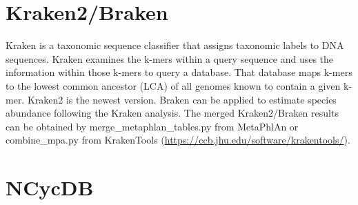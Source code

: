 \documentclass[
]{book}
\newenvironment{Shaded}{\begin{snugshade}}{\end{snugshade}}
\newcommand{\AttributeTok}[1]{\textcolor[rgb]{0.77,0.63,0.00}{#1}}
\newcommand{\CommentTok}[1]{\textcolor[rgb]{0.56,0.35,0.01}{\textit{#1}}}
\newcommand{\FunctionTok}[1]{\textcolor[rgb]{0.00,0.00,0.00}{#1}}
\newcommand{\NormalTok}[1]{#1}
\newcommand{\OtherTok}[1]{\textcolor[rgb]{0.56,0.35,0.01}{#1}}
\newcommand{\SpecialCharTok}[1]{\textcolor[rgb]{0.00,0.00,0.00}{#1}}
\newcommand{\StringTok}[1]{\textcolor[rgb]{0.31,0.60,0.02}{#1}}
\begin{document}
\hypertarget{kraken2braken}{%
\section{Kraken2/Braken}\label{kraken2braken}}

Kraken is a taxonomic sequence classifier that assigns taxonomic labels to DNA sequences.
Kraken examines the k-mers within a query sequence and uses the information within those k-mers to query a database.
That database maps k-mers to the lowest common ancestor (LCA) of all genomes known to contain a given k-mer.
Kraken2 \citep{Wood_Improved_2019} is the newest version.
Braken \citep{Lu_Bracken_2017} can be applied to estimate species abundance following the Kraken analysis.
The merged Kraken2/Braken results can be obtained by merge\_metaphlan\_tables.py from MetaPhlAn or combine\_mpa.py from KrakenTools (\url{https://ccb.jhu.edu/software/krakentools/}).

\begin{Shaded}
\end{Shaded}

\hypertarget{ncycdb}{%
\section{NCycDB}\label{ncycdb}}
\end{document}
